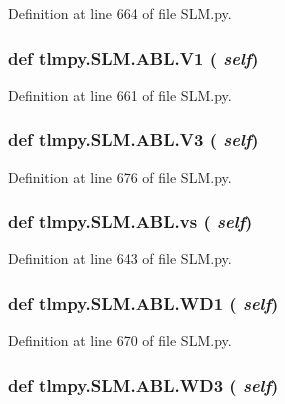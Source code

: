 Definition at line 664 of file SLM.py.\hypertarget{classtlmpy_1_1SLM_1_1ABL_a253d7972ac7b0e2c1e7d7ab6bb4ee36c}{
\subsubsection[{V1}]{\setlength{\rightskip}{0pt plus 5cm}def tlmpy.SLM.ABL.V1 ( {\em self})}}
\label{classtlmpy_1_1SLM_1_1ABL_a253d7972ac7b0e2c1e7d7ab6bb4ee36c}


Definition at line 661 of file SLM.py.\hypertarget{classtlmpy_1_1SLM_1_1ABL_a89b3588e30cdd751766aa6eb5b478d70}{
\subsubsection[{V3}]{\setlength{\rightskip}{0pt plus 5cm}def tlmpy.SLM.ABL.V3 ( {\em self})}}
\label{classtlmpy_1_1SLM_1_1ABL_a89b3588e30cdd751766aa6eb5b478d70}


Definition at line 676 of file SLM.py.\hypertarget{classtlmpy_1_1SLM_1_1ABL_ac05126b4ccb1d2882bd3ba8a80045bf5}{
\subsubsection[{vs}]{\setlength{\rightskip}{0pt plus 5cm}def tlmpy.SLM.ABL.vs ( {\em self})}}
\label{classtlmpy_1_1SLM_1_1ABL_ac05126b4ccb1d2882bd3ba8a80045bf5}


Definition at line 643 of file SLM.py.\hypertarget{classtlmpy_1_1SLM_1_1ABL_a7e60a5ae8e06ea0bf3e9c639e23f835d}{
\subsubsection[{WD1}]{\setlength{\rightskip}{0pt plus 5cm}def tlmpy.SLM.ABL.WD1 ( {\em self})}}
\label{classtlmpy_1_1SLM_1_1ABL_a7e60a5ae8e06ea0bf3e9c639e23f835d}


Definition at line 670 of file SLM.py.\hypertarget{classtlmpy_1_1SLM_1_1ABL_a1ab4a0d3969c869955dacc1f0ce7a781}{
\subsubsection[{WD3}]{\setlength{\rightskip}{0pt plus 5cm}def tlmpy.SLM.ABL.WD3 ( {\em self})}}
\label{classtlmpy_1_1SLM_1_1ABL_a1ab4a0d3969c869955dacc1f0ce7a781}


